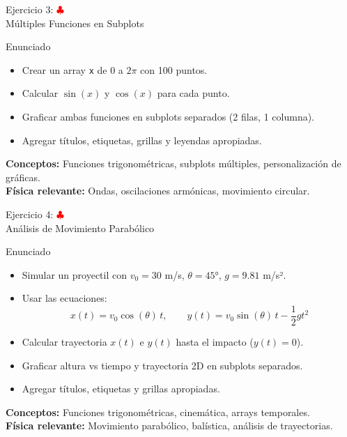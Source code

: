 \documentclass[10pt]{beamer}
\begin{document}
\begin{frame}{Ejercicio 3: \hfill \textcolor{red}{$\clubsuit$} \\ Múltiples Funciones en Subplots}
  \begin{block}{Enunciado}
    \begin{itemize}
      \item Crear un array \texttt{x} de 0 a \(2\pi\) con 100 puntos.
      \item Calcular \(\sin(x)\) y \(\cos(x)\) para cada punto.
      \item Graficar ambas funciones en subplots separados (2 filas, 1 columna).
      \item Agregar títulos, etiquetas, grillas y leyendas apropiadas.
    \end{itemize}
  \end{block}
  
  \textbf{Conceptos:} Funciones trigonométricas, subplots múltiples, personalización de gráficas.
  \\
  \textbf{Física relevante:} Ondas, oscilaciones armónicas, movimiento circular.
\end{frame}


\begin{frame}{Ejercicio 4: \hfill \textcolor{red}{$\clubsuit$} \\ Análisis de Movimiento Parabólico}
  \footnotesize
  \begin{block}{Enunciado}
    \begin{itemize}
      \setlength{\itemsep}{0.15em}
      \item Simular un proyectil con \(v_0 = 30\) m/s, \(\theta = 45°\), \(g = 9.81\) m/s².
      \item Usar las ecuaciones:
      \[
      x(t)=v_0\cos(\theta)\,t,
      \qquad
      y(t)=v_0\sin(\theta)\,t-\frac{1}{2}gt^2
      \]
      \item Calcular trayectoria \(x(t)\) e \(y(t)\) hasta el impacto (\(y(t) = 0\)).
      \item Graficar altura vs tiempo y trayectoria 2D en subplots separados.
      \item Agregar títulos, etiquetas y grillas apropiadas.
    \end{itemize}
  \end{block}
  
  \textbf{Conceptos:} Funciones trigonométricas, cinemática, arrays temporales.
  \\
  \textbf{Física relevante:} Movimiento parabólico, balística, análisis de trayectorias.
\end{frame}
\end{document}
